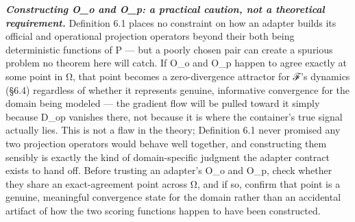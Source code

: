\documentclass[
]{article}
\begin{document}
\emph{\textbf{Constructing O\_o and O\_p: a practical caution, not a
theoretical requirement.}} Definition 6.1 places no constraint on how an
adapter builds its official and operational projection operators beyond
their both being deterministic functions of P --- but a poorly chosen
pair can create a spurious problem no theorem here will catch. If O\_o
and O\_p happen to agree exactly at some point in Ω, that point becomes
a zero-divergence attractor for ℱ's dynamics (§6.4) regardless of
whether it represents genuine, informative convergence for the domain
being modeled --- the gradient flow will be pulled toward it simply
because D\_op vanishes there, not because it is where the container's
true signal actually lies. This is not a flaw in the theory; Definition
6.1 never promised any two projection operators would behave well
together, and constructing them sensibly is exactly the kind of
domain-specific judgment the adapter contract exists to hand off. Before
trusting an adapter's O\_o and O\_p, check whether they share an
exact-agreement point across Ω, and if so, confirm that point is a
genuine, meaningful convergence state for the domain rather than an
accidental artifact of how the two scoring functions happen to have been
constructed.
\end{document}
